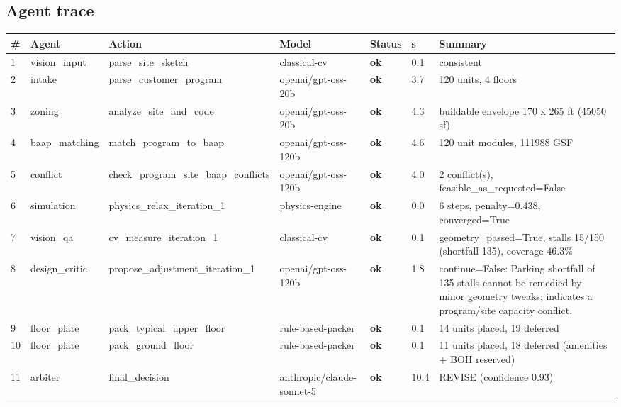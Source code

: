 \documentclass[10pt]{article}
\begin{document}
\subsection{Agent trace}
{\small \begin{longtable}{p{0.5cm}p{2.0cm}p{2.6cm}p{2.6cm}p{1.2cm}p{0.7cm}p{6.0cm}}
\toprule
\textbf{\#} & \textbf{Agent} & \textbf{Action} & \textbf{Model} & \textbf{Status} & \textbf{s} & \textbf{Summary} \\ \midrule \endhead
1 & vision\_input & parse\_site\_sketch & classical-cv & \textcolor{pass}{\textbf{ok}} & 0.1 & consistent \\
2 & intake & parse\_customer\_program & openai/gpt-oss-20b & \textcolor{pass}{\textbf{ok}} & 3.7 & 120 units, 4 floors \\
3 & zoning & analyze\_site\_and\_code & openai/gpt-oss-20b & \textcolor{pass}{\textbf{ok}} & 4.3 & buildable envelope 170 x 265 ft (45050 sf) \\
4 & baap\_matching & match\_program\_to\_baap & openai/gpt-oss-120b & \textcolor{pass}{\textbf{ok}} & 4.6 & 120 unit modules, 111988 GSF \\
5 & conflict & check\_program\_site\_baap\_conflicts & openai/gpt-oss-120b & \textcolor{pass}{\textbf{ok}} & 4.0 & 2 conflict(s), feasible\_as\_requested=False \\
6 & simulation & physics\_relax\_iteration\_1 & physics-engine & \textcolor{pass}{\textbf{ok}} & 0.0 & 6 steps, penalty=0.438, converged=True \\
7 & vision\_qa & cv\_measure\_iteration\_1 & classical-cv & \textcolor{pass}{\textbf{ok}} & 0.1 & geometry\_passed=True, stalls 15/150 (shortfall 135), coverage 46.3\% \\
8 & design\_critic & propose\_adjustment\_iteration\_1 & openai/gpt-oss-120b & \textcolor{pass}{\textbf{ok}} & 1.8 & continue=False: Parking shortfall of 135 stalls cannot be remedied by minor geometry tweaks; indicates a program/site capacity conflict. \\
9 & floor\_plate & pack\_typical\_upper\_floor & rule-based-packer & \textcolor{pass}{\textbf{ok}} & 0.1 & 14 units placed, 19 deferred \\
10 & floor\_plate & pack\_ground\_floor & rule-based-packer & \textcolor{pass}{\textbf{ok}} & 0.1 & 11 units placed, 18 deferred (amenities + BOH reserved) \\
11 & arbiter & final\_decision & anthropic/claude-sonnet-5 & \textcolor{pass}{\textbf{ok}} & 10.4 & REVISE (confidence 0.93) \\
\bottomrule
\end{longtable}}
\end{document}
